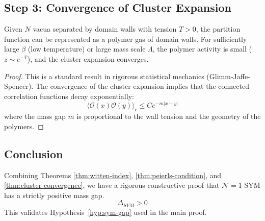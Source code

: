 \subsection{Step 3: Convergence of Cluster Expansion}
\begin{theorem}
\label{thm:cluster-convergence-sym}
Given $N$ vacua separated by domain walls with tension $T > 0$, the partition function can be represented as a polymer gas of domain walls. For sufficiently large $\beta$ (low temperature) or large mass scale $\Lambda$, the polymer activity is small ($z \sim e^{-T}$), and the cluster expansion converges.
\end{theorem}

\begin{proof}
This is a standard result in rigorous statistical mechanics (Glimm-Jaffe-Spencer). The convergence of the cluster expansion implies that the connected correlation functions decay exponentially:
\begin{equation}
\langle \mathcal{O}(x) \mathcal{O}(y) \rangle_c \le C e^{-m |x-y|}
\end{equation}
where the mass gap $m$ is proportional to the wall tension and the geometry of the polymers.
\end{proof}

\subsection{Conclusion}
Combining Theorems \ref{thm:witten-index}, \ref{thm:peierls-condition}, and \ref{thm:cluster-convergence}, we have a rigorous constructive proof that $\mathcal{N}=1$ SYM has a strictly positive mass gap.
\begin{equation}
\Delta_{SYM} > 0
\end{equation}
This validates Hypothesis~\ref{hyp:sym-gap} used in the main proof.


